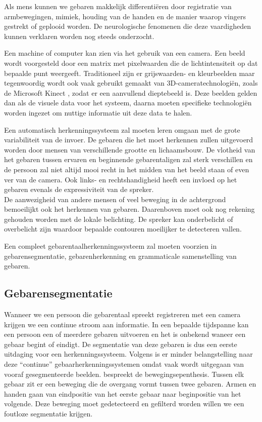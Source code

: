 \npar Als mens kunnen we gebaren makkelijk differenti\"eren door registratie van armbewegingen, mimiek, houding van de handen en de manier waarop vingers gestrekt of geplooid worden. De neurologische fenomenen die deze vaardigheden kunnen verklaren worden nog steeds onderzocht. 

\npar Een machine of computer kan zien via het gebruik van een camera. Een beeld wordt voorgesteld door een matrix met pixelwaarden die de lichtintensiteit op dat bepaalde punt weergeeft. Traditioneel zijn er grijswaarden- en kleurbeelden maar tegenwoordig wordt ook vaak gebruikt gemaakt van 3D-cameratechnologi\"en, zoals de Microsoft Kinect \cite{kuhn2011kinect}, zodat er een aanvullend dieptebeeld is. Deze beelden gelden dan als de visuele data voor het systeem, daarna moeten specifieke technologi\"en worden ingezet om nuttige informatie uit deze data te halen.

\npar Een automatisch herkenningssysteem zal moeten leren omgaan met de grote variabiliteit van de invoer. De gebaren die het moet herkennen zullen uitgevoerd worden door mensen van verschillende grootte en lichaamsbouw. De vlotheid van het gebaren tussen ervaren en beginnende gebarentaligen zal sterk verschillen en de persoon zal niet altijd mooi recht in het midden van het beeld staan of even ver van de camera. Ook links- en rechtshandigheid heeft een invloed op het gebaren evenals de expressiviteit van de spreker.
\\ De aanwezigheid van andere mensen of veel beweging in de achtergrond bemoeilijkt ook het herkennen van gebaren. Daarenboven moet ook nog rekening gehouden worden met de lokale belichting. De spreker kan onderbelicht of overbelicht zijn waardoor bepaalde contouren moeilijker te detecteren vallen.

\npar Een compleet gebarentaalherkenningssysteem zal moeten voorzien in gebarensegmentatie, gebarenherkenning en grammaticale samenstelling van gebaren.

\subsection{Gebarensegmentatie}
\npar Wanneer we een persoon die gebarentaal spreekt registreren met een camera krijgen we een continue stroom aan informatie. In een bepaalde tijdspanne kan een persoon een of meerdere gebaren uitvoeren en het is onbekend waneer een gebaar begint of eindigt. De segmentatie van deze gebaren is dus een eerste uitdaging voor een herkenningssysteem. Volgens \cite{hmdb-manual-segm} is er minder belangstelling naar deze ``continue'' gebaarherkenningssystemen omdat vaak wordt uitgegaan van vooraf gesegmenteerde beelden.
\npar  \cite{movement-epenthesis} bespreekt de bewegingsepenthesis. Tussen elk gebaar zit er een beweging die de overgang vormt tussen twee gebaren. Armen en handen gaan van eindpositie van het eerste gebaar naar beginpositie van het volgende. Deze beweging moet gedetecteerd en gefilterd worden willen we een foutloze segmentatie krijgen.

